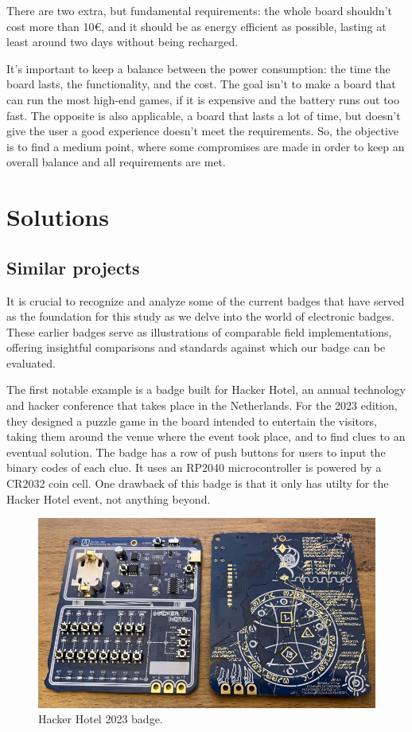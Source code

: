 \documentclass[english]{ist-thesis}
\begin{document}
There are two extra, but fundamental requirements: the whole board shouldn't cost more than 10€, and it should be as energy efficient as possible, lasting at least around two days without being recharged. 

It's important to keep a balance between the power consumption: the time the board lasts, the functionality, and the cost. The goal isn't to make a board that can run the most high-end games, if it is expensive and the battery runs out too fast. The opposite is also applicable, a board that lasts a lot of time, but doesn't give the user a good experience doesn't meet the requirements. So, the objective is to find a medium point, where some compromises are made in order to keep an overall balance and all requirements are met.  


\chapter{Solutions}

\section{Similar projects}

It is crucial to recognize and analyze some of the current badges that have served as the foundation for this study as we delve into the world of electronic badges. These earlier badges serve as illustrations of comparable field implementations, offering insightful comparisons and standards against which our badge can be evaluated. 

The first notable example is a badge built for Hacker Hotel, an annual technology and hacker conference that takes place in the Netherlands. For the 2023 edition, they designed a puzzle game in the board intended to entertain the visitors, taking them around the venue where the event took place, and to find clues to an eventual solution. The badge has a row of push buttons for users to input the binary codes of each clue. It uses an RP2040 microcontroller is powered by a CR2032 coin cell. One drawback of this badge is that it only has utilty for the Hacker Hotel event, not anything beyond. 

\begin{figure}[ht]
	\centering
	\includegraphics[width = 0.8\linewidth]{images/hacker_hotel.jpg}
	\caption{Hacker Hotel 2023 badge.}
	\label{fig:hacker_hotel}
\end{figure}
\end{document}
